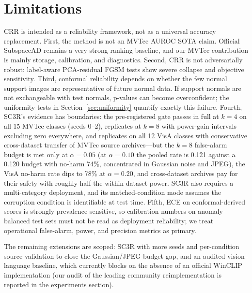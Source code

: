 \section{Limitations}\label{sec:limitations}
CRR is intended as a reliability framework, not as a universal accuracy replacement. First, the method is not an MVTec AUROC SOTA claim. Official SubspaceAD remains a very strong ranking baseline, and our MVTec contribution is mainly storage, calibration, and diagnostics. Second, CRR is not adversarially robust: label-aware PCA-residual FGSM tests show severe collapse and objective sensitivity. Third, conformal reliability depends on whether the few normal support images are representative of future normal data. If support normals are not exchangeable with test normals, p-values can become overconfident; the uniformity tests in Section~\ref{sec:uniformity} quantify exactly this failure. Fourth, SC3R's evidence has boundaries: the pre-registered gate passes in full at $k{=}4$ on all 15 MVTec classes (seeds 0--2), replicates at $k{=}8$ with power-gain intervals excluding zero everywhere, and replicates on all 12 VisA classes with conservative cross-dataset transfer of MVTec source archives---but the $k{=}8$ false-alarm budget is met only at $\alpha{=}0.05$ (at $\alpha{=}0.10$ the pooled rate is 0.121 against a 0.120 budget with no-harm 74\%, concentrated in Gaussian noise and JPEG), the VisA no-harm rate dips to 78\% at $\alpha{=}0.20$, and cross-dataset archives pay for their safety with roughly half the within-dataset power. SC3R also requires a multi-category deployment, and its matched-condition mode assumes the corruption condition is identifiable at test time. Fifth, ECE on conformal-derived scores is strongly prevalence-sensitive, so calibration numbers on anomaly-balanced test sets must not be read as deployment reliability; we treat operational false-alarm, power, and precision metrics as primary.

The remaining extensions are scoped: SC3R with more seeds and per-condition source validation to close the Gaussian/JPEG budget gap, and an audited vision--language baseline, which currently blocks on the absence of an official WinCLIP implementation (our audit of the leading community reimplementation is reported in the experiments section).
